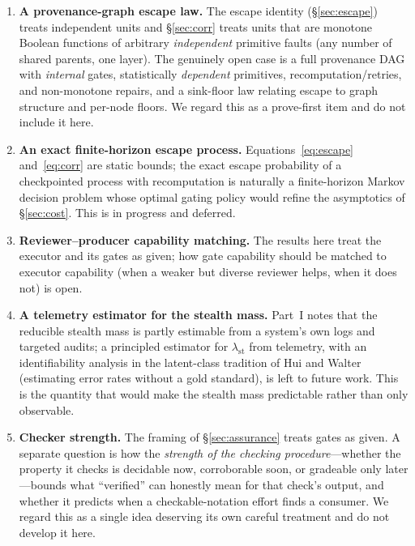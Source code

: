 \documentclass[11pt]{article}
\theoremstyle{definition}
\theoremstyle{remark}
\newcommand{\lst}{\lambda_{\mathrm{st}}}
\begin{document}
\begin{enumerate}[leftmargin=1.6em,itemsep=3pt]
\item \textbf{A provenance-graph escape law.} The escape identity (\S\ref{sec:escape}) treats
independent units and \S\ref{sec:corr} treats units that are monotone Boolean functions of arbitrary
\emph{independent} primitive faults (any number of shared parents, one layer). The genuinely open case
is a full provenance DAG with \emph{internal} gates, statistically \emph{dependent} primitives,
recomputation/retries, and non-monotone repairs, and a sink-floor law relating escape to graph
structure and per-node floors. We regard this as a prove-first item and do not include it here.
\item \textbf{An exact finite-horizon escape process.} Equations~\eqref{eq:escape}
and~\eqref{eq:corr} are static bounds; the exact escape probability of a checkpointed process with
recomputation is naturally a finite-horizon Markov decision problem whose optimal gating policy would
refine the asymptotics of \S\ref{sec:cost}. This is in progress and deferred.
\item \textbf{Reviewer--producer capability matching.} The results here treat the executor and its
gates as given; how gate capability should be matched to executor capability (when a weaker but
diverse reviewer helps, when it does not) is open.
\item \textbf{A telemetry estimator for the stealth mass.} Part~I notes that the reducible stealth
mass is partly estimable from a system's own logs and targeted audits; a principled estimator for
$\lst$ from telemetry, with an identifiability analysis in the latent-class tradition of Hui and
Walter~\cite{huiwalter1980} (estimating error rates without a gold standard), is left to future work.
This is the quantity that would make the stealth mass predictable rather than only observable.
\item \textbf{Checker strength.} The framing of \S\ref{sec:assurance} treats gates as given. A separate
question is how the \emph{strength of the checking procedure}---whether the property it checks is
decidable now, corroborable soon, or gradeable only later---bounds what ``verified'' can honestly mean
for that check's output, and whether it predicts when a checkable-notation effort finds a consumer. We
regard this as a single idea deserving its own careful treatment and do not develop it here.
\end{enumerate}
\end{document}
